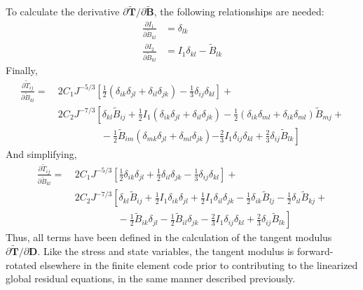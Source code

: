 To calculate the derivative $\partial \tilde{\bm T}/\partial {\tilde{\bm {B}}}$, the following relationships are needed:
\begin{align}
\frac{\partial I_1}{\partial \tilde{B}_{kl}} &= \delta_{lk}  \\
\frac{\partial I_2}{\partial \tilde{B}_{kl}} &= I_1\delta_{kl} - \tilde{B}_{lk}
\end{align}
Finally,
\begin{equation}
\begin{aligned}
\frac{\partial \tilde{T}_{ij}}{\partial \tilde{B}_{kl}} = &\ 2C_1J^{-5/3}\left[\frac{1}{2}\left(\delta_{ik}\delta_{jl} + \delta_{il}\delta_{jk}\right) - \frac{1}{3}\delta_{ij}\delta_{kl}\right] + \\
&\ 2C_2J^{-7/3}\left[\delta_{kl}\tilde{B}_{ij} + \frac{1}{2}I_1\left(\delta_{ik}\delta_{jl} + \delta_{il}\delta_{jk}\right) -\frac{1}{2}\left(\delta_{ik}\delta_{ml} + \delta_{ik}\delta_{ml}\right)\tilde{B}_{mj} \right. + \\
&\phantom{xxxxxxxx}-\frac{1}{2}\tilde{B}_{im}\left(\delta_{mk}\delta_{jl} +\delta_{ml}\delta_{jk}\right) 
\left.- \frac{2}{3}I_1\delta_{ij}\delta_{kl} + \frac{2}{3}\delta_{ij}\tilde{B}_{lk}\right]
\end{aligned}
\end{equation}
And simplifying,
\begin{equation}
\begin{aligned}
\frac{\partial \tilde{T}_{ij}}{\partial \tilde{B}_{kl}} = &\ 2C_1J^{-5/3}\left[\frac{1}{2}\delta_{ik}\delta_{jl} + \frac{1}{2}\delta_{il}\delta_{jk} - \frac{1}{3}\delta_{ij}\delta_{kl}\right] + \\
&\ 2C_2J^{-7/3}\left[\delta_{kl}\tilde{B}_{ij} + \frac{1}{2}I_1\delta_{ik}\delta_{jl} + \frac{1}{2}I_1\delta_{il}\delta_{jk} -\frac{1}{2}\delta_{ik}\tilde{B}_{lj} -\frac{1}{2}\delta_{il}\tilde{B}_{kj} \right. + \\
&\left.\phantom{xxxxxxxx}-\frac{1}{2}\tilde{B}_{ik}\delta_{jl} -\frac{1}{2}\tilde{B}_{il}\delta_{jk} - \frac{2}{3}I_1\delta_{ij}\delta_{kl} + \frac{2}{3}\delta_{ij}\tilde{B}_{lk}\right]
\end{aligned}
\end{equation}
Thus, all terms have been defined in the calculation of the tangent modulus $\partial{\tilde{\bm{T}}}/\partial{\bm{D}}$. Like the stress and state variables, the tangent modulus is forward-rotated elsewhere in the finite element code prior to contributing to the linearized global residual equations, in the same manner described previously.

